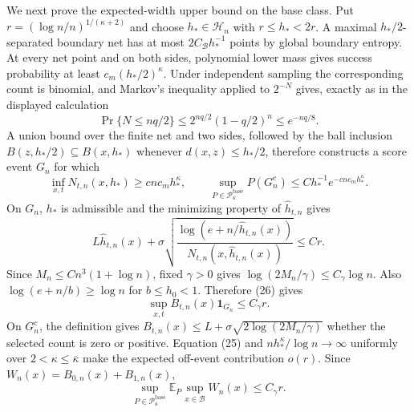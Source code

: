 We next prove the expected-width upper bound on the base class.  Put \(r=(\log n/n)^{1/(\kappa+2)}\) and choose \(h_*\in\mathcal H_n\) with \(r\le h_*<2r\).  A maximal \(h_*/2\)-separated boundary net has at most \(2C_{\mathcal B}h_*^{-1}\) points by global boundary entropy.  At every net point and on both sides, polynomial lower mass gives success probability at least \(c_m(h_*/2)^\kappa\).  Under independent sampling the corresponding count is binomial, and Markov's inequality applied to \(2^{-N}\) gives, exactly as in the displayed calculation
\[
 \Pr\{N\le nq/2\}
 \le2^{nq/2}(1-q/2)^n\le e^{-nq/8}.
\]
A union bound over the finite net and two sides, followed by the ball inclusion \(B(z,h_*/2)\subseteq B(x,h_*)\) whenever \(d(x,z)\le h_*/2\), therefore constructs a score event \(G_n\) for which
\[
 \inf_{x,t}N_{t,n}(x,h_*)\ge cnc_mh_*^\kappa,
 \qquad
 \sup_{P\in\mathcal P_{\kappa}^{\mathrm{base}}}P(G_n^c)
 \le Ch_*^{-1}e^{-cnc_mh_*^\kappa}. \tag{25}
\]
On \(G_n\), \(h_*\) is admissible and the minimizing property of \(\widehat h_{t,n}\) gives
\[
 L\widehat h_{t,n}(x)+
 \sigma\sqrt{\frac{\log(e+n/\widehat h_{t,n}(x))}
 {N_{t,n}(x,\widehat h_{t,n}(x))}}
 \le Cr. \tag{26}
\]
Since \(M_n\le Cn^3(1+\log n)\), fixed \(\gamma>0\) gives \(\log(2M_n/\gamma)\le C_\gamma\log n\).  Also \(\log(e+n/b)\ge\log n\) for \(b\le h_0<1\).  Therefore (26) gives
\[
 \sup_{x,t}B_{t,n}(x)\mathbf 1_{G_n}\le C_\gamma r. \tag{27}
\]
On \(G_n^c\), the definition gives \(B_{t,n}(x)\le L+\sigma\sqrt{2\log(2M_n/\gamma)}\) whether the selected count is zero or positive.  Equation (25) and \(nh_*^\kappa/\log n\to\infty\) uniformly over \(2<\kappa\le\overline\kappa\) make the expected off-event contribution \(o(r)\).  Since \(W_n(x)=B_{0,n}(x)+B_{1,n}(x)\),
\[
 \sup_{P\in\mathcal P_{\kappa}^{\mathrm{base}}}
 \mathbb E_P\sup_{x\in\mathcal B}W_n(x)\le C_\gamma r. \tag{28}
\]

